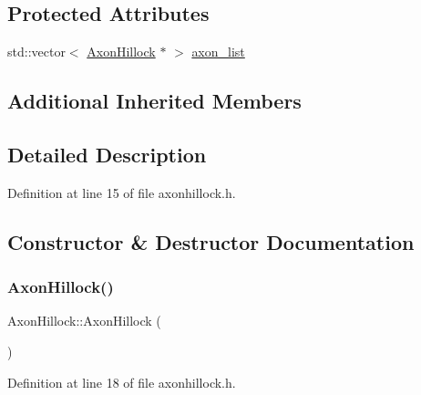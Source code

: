 \subsection*{Protected Attributes}
\begin{DoxyCompactItemize}
\item 
std\+::vector$<$ \mbox{\hyperlink{class_axon_hillock}{Axon\+Hillock}} $\ast$ $>$ \mbox{\hyperlink{class_axon_hillock_a110d655ded8e09306b224b6e940cd60b}{axon\+\_\+list}}
\end{DoxyCompactItemize}
\subsection*{Additional Inherited Members}


\subsection{Detailed Description}


Definition at line 15 of file axonhillock.\+h.



\subsection{Constructor \& Destructor Documentation}
\mbox{\label{class_axon_hillock_a432095dfb25ece393cdd83b5eb4f097a}} 
\subsubsection{\texorpdfstring{Axon\+Hillock()}{AxonHillock()}\hspace{0.1cm}{\footnotesize\ttfamily [1/4]}}
{\footnotesize\ttfamily Axon\+Hillock\+::\+Axon\+Hillock (\begin{DoxyParamCaption}{ }\end{DoxyParamCaption})\hspace{0.3cm}{\ttfamily [inline]}}



Definition at line 18 of file axonhillock.\+h.

\mbox{\label{class_axon_hillock_a20a4da0885f32bfca34ab5cda2a13562}} 
